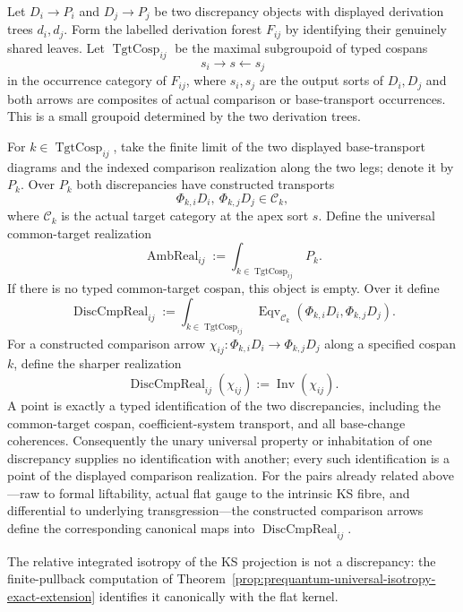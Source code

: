 \begin{construction}
\label{constr:prequantum-typed-discrepancy-comparison}
Let $D_i\to P_i$ and $D_j\to P_j$ be two discrepancy objects with displayed
derivation trees $d_i,d_j$.  Form the labelled derivation forest $F_{ij}$ by
identifying their genuinely shared leaves.  Let
$\operatorname{TgtCosp}_{ij}$ be the maximal subgroupoid of typed cospans
\[
s_i\longrightarrow s\longleftarrow s_j
\]
in the occurrence category of $F_{ij}$, where $s_i,s_j$ are the output sorts of
$D_i,D_j$ and both arrows are composites of actual comparison or base-transport
occurrences.  This is a small groupoid determined by the two derivation trees.

For $k\in\operatorname{TgtCosp}_{ij}$, take the finite limit of the two displayed
base-transport diagrams and the indexed comparison realization along the two
legs; denote it by $P_k$.  Over $P_k$ both discrepancies have constructed
transports
\[
\Phi_{k,i}D_i,\ \Phi_{k,j}D_j\in\mathcal C_k,
\]
where $\mathcal C_k$ is the actual target category at the apex sort $s$.  Define
the universal common-target realization
\[
\boxed{
\operatorname{AmbReal}_{ij}
:=
\int_{k\in\operatorname{TgtCosp}_{ij}}P_k.
}
\]
If there is no typed common-target cospan, this object is empty.  Over it define
\[
\boxed{
\operatorname{DiscCmpReal}_{ij}
:=
\int_{k\in\operatorname{TgtCosp}_{ij}}
\operatorname{Eqv}_{\mathcal C_k}
\left(\Phi_{k,i}D_i,\Phi_{k,j}D_j\right).
}
\]
For a constructed comparison arrow
$\chi_{ij}:\Phi_{k,i}D_i\to\Phi_{k,j}D_j$ along a specified cospan $k$, define
the sharper realization
\[
\boxed{
\operatorname{DiscCmpReal}_{ij}(\chi_{ij})
:=
\operatorname{Inv}(\chi_{ij}).
}
\]
A point is exactly a typed identification of the two discrepancies, including
the common-target cospan, coefficient-system transport, and all base-change
coherences.  Consequently
the unary universal property or inhabitation of one discrepancy supplies no
identification with another; every such identification is a point of the
displayed comparison realization.  For the pairs already related above---raw to
formal liftability, actual flat gauge to the intrinsic KS fibre, and differential
to underlying transgression---the constructed comparison arrows define the
corresponding canonical maps into $\operatorname{DiscCmpReal}_{ij}$.

The relative integrated isotropy of the KS projection is not a discrepancy: the
finite-pullback computation of
Theorem~\ref{prop:prequantum-universal-isotropy-exact-extension} identifies it
canonically with the flat kernel.
\end{construction}

